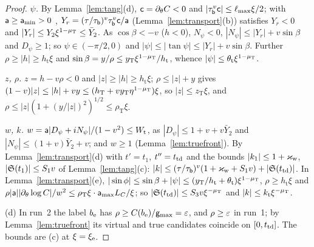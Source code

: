 \begin{proof}
\emph{$\psi$.} By Lemma~\ref{lem:tang}(d), $\mathsf c=\partial_\theta C<0$ and $|\tau_{\mathsf b}^v\mathsf c|\le\ell_{\max}\xi/2$; with
$\mathsf a\ge\mathsf a_{\min}>0$ , $Y_r=(\tau/\tau_{\mathsf b})^v\tau_{\mathsf b}^v\mathsf c/\mathsf a$ (Lemma~\ref{lem:transport}(b)) satisfies $Y_r<0$ and
$|Y_r|\le Y_2\xi^{1-\mu_{\mathrm T}}\le\bar Y_2$. As $\cos\beta<-v$ ($h<0$), $N_\psi<0$, $|N_\psi|\le|Y_r|+v\sin\beta$ and $D_\psi\ge1$; so
$\psi\in(-\pi/2,0)$ and $|\psi|\le|\tan\psi|\le|Y_r|+v\sin\beta$. Further $\rho\ge|h|\ge h_{\mathrm t}\xi$ and
$\sin\beta=y/\rho\le y_{\mathrm T}\xi^{1-\mu_{\mathrm T}}/h_{\mathrm t}$, whence $|\psi|\le\theta_{\mathrm t}\xi^{1-\mu_{\mathrm T}}$.

\emph{$z$, $\rho$.} $z=h-v\rho<0$ and $|z|\ge|h|\ge h_{\mathrm t}\xi$; $\rho\le|z|+y$ gives
$(1-v)|z|\le|h|+vy\le(h_{\mathrm T}+vy_{\mathrm T}\eta^{1-\mu_{\mathrm T}})\xi$, so $|z|\le z_{\mathrm T}\xi$, and
$\rho\le|z|(1+(y/|z|)^2)^{1/2}\le\rho_{\mathrm T}\xi$.

\emph{$w$, $k$.} $w=\mathsf a|D_\psi+iN_\psi|/(1-v^2)\le W_{\mathrm t}$, as $|D_\psi|\le1+v+v\bar Y_2$ and $|N_\psi|\le(1+v)\bar Y_2+v$; and
$w\ge1$ (Lemma~\ref{lem:truefront}). By Lemma~\ref{lem:transport}(d) with $t'=t_1$, $t''=t_{\mathrm{td}}$ and the bounds $|k_1|\le1+\varkappa_{\mathrm w}$,
$|\mathfrak S(t_1)|\le S_1v$ of Lemma~\ref{lem:tang}(c): $|k|\le(\tau/\tau_{\mathsf b})^v(1+\varkappa_{\mathrm w}+S_1v)+|\mathfrak S(t_{\mathrm{td}})|$. In
Lemma~\ref{lem:transport}(e), $|\sin\phi|\le\sin\beta+|\psi|\le(y_{\mathrm T}/h_{\mathrm t}+\theta_{\mathrm t})\xi^{1-\mu_{\mathrm T}}$, $\rho\ge h_{\mathrm t}\xi$
and $\rho|\mathsf a||\partial_\theta\log C|/w^2\le\rho_{\mathrm T}\xi\cdot\mathsf a_{\max}L_C/\xi$; so $|\mathfrak S(t_{\mathrm{td}})|\le S_3v\xi^{-\mu_{\mathrm T}}$ and
$|k|\le k_{\mathrm t}\xi^{-\mu_{\mathrm T}}$.

(d) In run~2 the label $b_{\mathrm e}$ has $\rho\ge C(b_{\mathrm e})/\mathsf g_{\max}=\varepsilon$, and $\rho\ge\varepsilon$ in run~1; by Lemma~\ref{lem:truefront} its virtual and
true candidates coincide on $[0,t_{\mathrm{td}}]$. The bounds are (c) at $\xi=\xi_{\mathrm e}$.


\end{proof}

